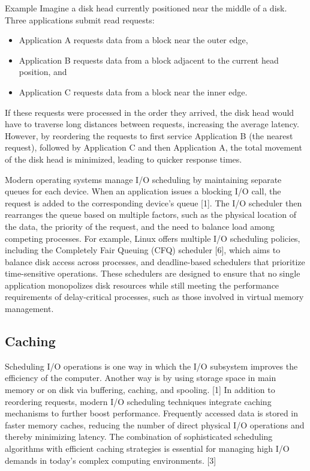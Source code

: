 \documentclass[a4paper]{article}
\begin{document}
\begin{examplebox}{Example} Imagine a disk head currently positioned near the middle of a disk. Three applications submit read requests:

\begin{itemize}
    \item Application A requests data from a block near the outer edge,
    \item Application B requests data from a block adjacent to the current head position, and
    \item Application C requests data from a block near the inner edge.
\end{itemize}
If these requests were processed in the order they arrived, the disk head would have to
 traverse long distances between requests, increasing the average latency. However, by 
 reordering the requests to first service Application B (the nearest request), followed by 
 Application C and then Application A, the total movement of the disk head is minimized, 
 leading to quicker response times. 
\end{examplebox}

Modern operating systems manage I/O scheduling by maintaining separate queues for each device. When an application issues a blocking I/O call, the request is added to the corresponding device’s queue [1]. The I/O scheduler then rearranges the queue based on multiple factors, such as the physical location of the data, the priority of the request, and the need to balance load among competing processes. For example, Linux offers multiple I/O scheduling policies, including the Completely Fair Queuing (CFQ) scheduler [6], which aims to balance disk access across processes, and deadline-based schedulers that prioritize time-sensitive operations. These schedulers are designed to ensure that no single application monopolizes disk resources while still meeting the performance requirements of delay-critical processes, such as those involved in virtual memory management.

\subsection{Caching}

Scheduling I/O operations is one way in which the I/O subsystem improves
the efficiency of the computer. Another way is by using storage space in main
memory or on disk via buffering, caching, and spooling. [1]
In addition to reordering requests, modern I/O scheduling techniques 
integrate caching mechanisms to further boost performance. Frequently accessed data
 is stored in faster memory caches, reducing the number of direct physical I/O operations 
 and thereby minimizing latency. The combination of sophisticated scheduling algorithms with 
 efficient caching strategies is essential for managing high I/O demands in today's complex computing 
 environments. [3]
 \\
    \vspace{1em}
\end{document}

